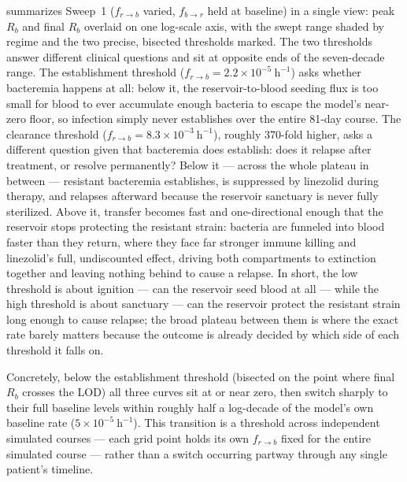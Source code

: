 \documentclass[11pt]{article}
\begin{document}
 summarizes Sweep~1 ($f_{r \to b}$ varied,
$f_{b \to r}$ held at baseline) in a single view: peak $R_b$ and final
$R_b$ overlaid on one log-scale axis, with the swept range shaded
by regime and the two precise, bisected thresholds marked. The two
thresholds answer different clinical questions and sit at opposite ends of
the seven-decade range. The establishment threshold
($f_{r \to b} = 2.2\times10^{-5}~\mathrm{h}^{-1}$) asks whether bacteremia
happens at all: below it, the reservoir-to-blood seeding flux is too small
for blood to ever accumulate enough bacteria to escape the model's
near-zero floor, so infection simply never establishes over the entire
81-day course. The clearance threshold
($f_{r \to b} = 8.3\times10^{-3}~\mathrm{h}^{-1}$), roughly 370-fold
higher, asks a different question given that bacteremia does establish:
does it relapse after treatment, or resolve permanently? Below it ---
across the whole plateau in between --- resistant bacteremia establishes,
is suppressed by linezolid during therapy, and relapses afterward because
the reservoir sanctuary is never fully sterilized. Above it, transfer
becomes fast and one-directional enough that the reservoir stops
protecting the resistant strain: bacteria are funneled into blood faster
than they return, where they face far stronger immune killing and
linezolid's full, undiscounted effect, driving both compartments to
extinction together and leaving nothing behind to cause a relapse. In
short, the low threshold is about ignition --- can the reservoir seed
blood at all --- while the high threshold is about sanctuary --- can the
reservoir protect the resistant strain long enough to cause relapse; the
broad plateau between them is where the exact rate barely matters because
the outcome is already decided by which side of each threshold it falls
on.

Concretely, below the establishment threshold (bisected on the point where
final $R_b$ crosses the LOD) all three curves sit at or near zero, then
switch sharply to their full baseline levels within roughly half a
log-decade of the model's own baseline rate ($5\times10^{-5}~\mathrm{h}^{-1}$).
This transition is a threshold across independent simulated courses ---
each grid point holds its own $f_{r \to b}$ fixed for the entire simulated
course --- rather than a switch occurring partway through any single
patient's timeline.
\end{document}
